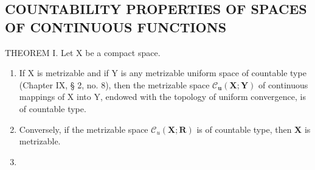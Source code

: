 \subsection{COUNTABILITY PROPERTIES OF SPACES OF CONTINUOUS FUNCTIONS}

THEOREM I. Let X be a compact space.

\begin{enumerate}
\def\labelenumi{\alph{enumi})}
\item
  If X is metrizable and if Y is any metrizable uniform space of countable type (Chapter IX, § 2, no. 8), then the metrizable space \(\mathcal{C}_{\mathbf{u}}(\mathbf{X};\mathbf{Y})\) of continuous mappings of X into Y, endowed with the topology of uniform convergence, is of countable type.
\item
  Conversely, if the metrizable space \(\mathcal{C}_{u}(\mathbf{X};\mathbf{R})\) is of countable type, then \(\mathbf{X}\) is metrizable.
\item

\end{enumerate}
